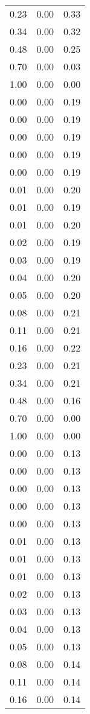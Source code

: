 \begin{table}[ht]
\begin{table}[ht]
\begin{tabular}{|ccc}
  0.23 & 0.00 & 0.33 \\ 
  0.34 & 0.00 & 0.32 \\ 
  0.48 & 0.00 & 0.25 \\ 
  0.70 & 0.00 & 0.03 \\ 
  1.00 & 0.00 & 0.00 \\ 
  0.00 & 0.00 & 0.19 \\ 
  0.00 & 0.00 & 0.19 \\ 
  0.00 & 0.00 & 0.19 \\ 
  0.00 & 0.00 & 0.19 \\ 
  0.00 & 0.00 & 0.19 \\ 
  0.01 & 0.00 & 0.20 \\ 
  0.01 & 0.00 & 0.19 \\ 
  0.01 & 0.00 & 0.20 \\ 
  0.02 & 0.00 & 0.19 \\ 
  0.03 & 0.00 & 0.19 \\ 
  0.04 & 0.00 & 0.20 \\ 
  0.05 & 0.00 & 0.20 \\ 
  0.08 & 0.00 & 0.21 \\ 
  0.11 & 0.00 & 0.21 \\ 
  0.16 & 0.00 & 0.22 \\ 
  0.23 & 0.00 & 0.21 \\ 
  0.34 & 0.00 & 0.21 \\ 
  0.48 & 0.00 & 0.16 \\ 
  0.70 & 0.00 & 0.00 \\ 
  1.00 & 0.00 & 0.00 \\ 
  0.00 & 0.00 & 0.13 \\ 
  0.00 & 0.00 & 0.13 \\ 
  0.00 & 0.00 & 0.13 \\ 
  0.00 & 0.00 & 0.13 \\ 
  0.00 & 0.00 & 0.13 \\ 
  0.01 & 0.00 & 0.13 \\ 
  0.01 & 0.00 & 0.13 \\ 
  0.01 & 0.00 & 0.13 \\ 
  0.02 & 0.00 & 0.13 \\ 
  0.03 & 0.00 & 0.13 \\ 
  0.04 & 0.00 & 0.13 \\ 
  0.05 & 0.00 & 0.13 \\ 
  0.08 & 0.00 & 0.14 \\ 
  0.11 & 0.00 & 0.14 \\ 
  0.16 & 0.00 & 0.14 \\ 

\end{tabular}
\end{table}
\end{table}
